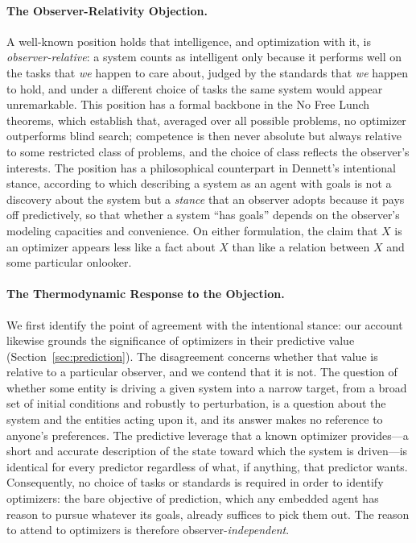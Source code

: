 \documentclass[11pt]{article}
\begin{document}
\paragraph{The Observer-Relativity Objection.} A well-known position holds that intelligence, and optimization with it, is \emph{observer-relative}: a system counts as intelligent only because it performs well on the tasks that \emph{we} happen to care about, judged by the standards that \emph{we} happen to hold, and under a different choice of tasks the same system would appear unremarkable. This position has a formal backbone in the No Free Lunch theorems, which establish that, averaged over all possible problems, no optimizer outperforms blind search; competence is then never absolute but always relative to some restricted class of problems, and the choice of class reflects the observer's interests. The position has a philosophical counterpart in Dennett's intentional stance, according to which describing a system as an agent with goals is not a discovery about the system but a \emph{stance} that an observer adopts because it pays off predictively, so that whether a system ``has goals'' depends on the observer's modeling capacities and convenience. On either formulation, the claim that $X$ is an optimizer appears less like a fact about $X$ than like a relation between $X$ and some particular onlooker.

\paragraph{The Thermodynamic Response to the Objection.} We first identify the point of agreement with the intentional stance: our account likewise grounds the significance of optimizers in their predictive value (Section~\ref{sec:prediction}). The disagreement concerns whether that value is relative to a particular observer, and we contend that it is not. The question of whether some entity is driving a given system into a narrow target, from a broad set of initial conditions and robustly to perturbation, is a question about the system and the entities acting upon it, and its answer makes no reference to anyone's preferences. The predictive leverage that a known optimizer provides---a short and accurate description of the state toward which the system is driven---is identical for every predictor regardless of what, if anything, that predictor wants. Consequently, no choice of tasks or standards is required in order to identify optimizers: the bare objective of prediction, which any embedded agent has reason to pursue whatever its goals, already suffices to pick them out. The reason to attend to optimizers is therefore observer-\emph{independent}.
\end{document}
